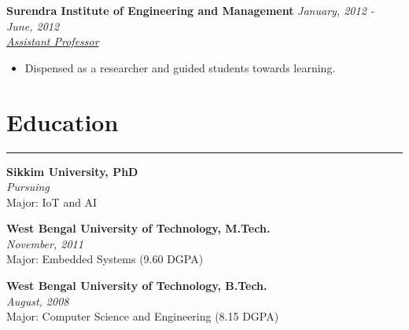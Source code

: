 \documentclass[10pt, a4paper]{article}
\begin{document}
  \noindent\textbf{Surendra Institute of Engineering and Management} \hfill \textit{January, 2012 - June, 2012}\\
  \textit{\underline{Assistant Professor}} \\
\vspace*{-4mm}
\begin{itemize}[leftmargin=*]
	\item Dispensed as a researcher and guided students towards learning.

\end{itemize}


	\vspace*{-5mm}	

    
    \section*{Education}
    \vspace*{-2.5mm}
    \hrule 
    \vspace*{2mm}
 
\noindent     \textbf{Sikkim University, PhD}\\
 \textit{Pursuing}\\
 Major: IoT and AI\\
    
 \vspace*{-2mm}
 
 \noindent    \textbf{West Bengal University of Technology, M.Tech.}\\
    \textit{November, 2011}\\
    Major: Embedded Systems (9.60 DGPA)\\
    
   
    \vspace*{-2mm}
    
    \noindent
    \textbf{West Bengal University of Technology, B.Tech.}\\
    \textit{August, 2008}\\
    Major: Computer Science and Engineering (8.15 DGPA)\\
    
    
    \vspace*{-7mm}	
       		
\end{document}
